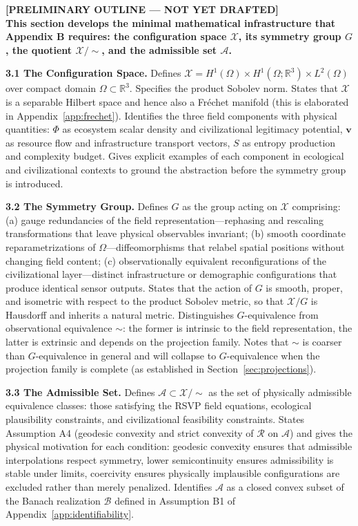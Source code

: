 \documentclass[12pt, oneside]{article}
\newcommand{\preliminary}[1]{%
  \colorbox{yellow!20}{\parbox{\dimexpr\linewidth-2\fboxsep}{%
    \textbf{\textcolor{red!70!black}{[PRELIMINARY OUTLINE --- NOT YET DRAFTED]}}\\[4pt]
    #1
  }}%
}
\begin{document}
\preliminary{
\textbf{This section develops the minimal mathematical infrastructure that Appendix B
requires: the configuration space $\mathcal{X}$, its symmetry group $G$, the quotient
$\mathcal{X}/{\sim}$, and the admissible set $\mathcal{A}$.}

\medskip
\textbf{3.1 The Configuration Space.}
Defines $\mathcal{X} = H^1(\Omega) \times H^1(\Omega;\mathbb{R}^3) \times L^2(\Omega)$
over compact domain $\Omega \subset \mathbb{R}^3$. Specifies the product Sobolev norm.
States that $\mathcal{X}$ is a separable Hilbert space and hence also a Fréchet manifold
(this is elaborated in Appendix~\ref{app:frechet}). Identifies the three field components
with physical quantities: $\Phi$ as ecosystem scalar density and civilizational legitimacy
potential, $\mathbf{v}$ as resource flow and infrastructure transport vectors, $S$ as
entropy production and complexity budget. Gives explicit examples of each component in
ecological and civilizational contexts to ground the abstraction before the symmetry group
is introduced.

\medskip
\textbf{3.2 The Symmetry Group.}
Defines $G$ as the group acting on $\mathcal{X}$ comprising: (a) gauge redundancies of
the field representation---rephasing and rescaling transformations that leave physical
observables invariant; (b) smooth coordinate reparametrizations of $\Omega$---diffeomorphisms
that relabel spatial positions without changing field content; (c) observationally
equivalent reconfigurations of the civilizational layer---distinct infrastructure or
demographic configurations that produce identical sensor outputs. States that the action
of $G$ is smooth, proper, and isometric with respect to the product Sobolev metric, so
that $\mathcal{X}/G$ is Hausdorff and inherits a natural metric. Distinguishes $G$-equivalence
from observational equivalence $\sim$: the former is intrinsic to the field representation,
the latter is extrinsic and depends on the projection family. Notes that $\sim$ is coarser
than $G$-equivalence in general and will collapse to $G$-equivalence when the projection
family is complete (as established in Section~\ref{sec:projections}).

\medskip
\textbf{3.3 The Admissible Set.}
Defines $\mathcal{A} \subset \mathcal{X}/{\sim}$ as the set of physically admissible
equivalence classes: those satisfying the RSVP field equations, ecological plausibility
constraints, and civilizational feasibility constraints. States Assumption A4 (geodesic
convexity and strict convexity of $\mathcal{R}$ on $\mathcal{A}$) and gives the physical
motivation for each condition: geodesic convexity ensures that admissible interpolations
respect symmetry, lower semicontinuity ensures admissibility is stable under limits,
coercivity ensures physically implausible configurations are excluded rather than merely
penalized. Identifies $\mathcal{A}$ as a closed convex subset of the Banach realization
$\mathcal{B}$ defined in Assumption B1 of Appendix~\ref{app:identifiability}.

}
\end{document}
